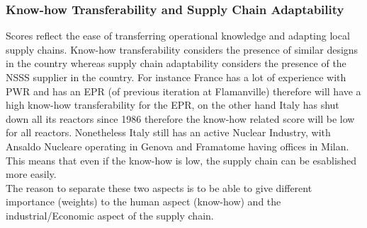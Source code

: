 



\subsubsection{Know-how Transferability and Supply Chain Adaptability}
Scores reflect the ease of transferring operational knowledge and adapting local supply chains. Know-how transferability considers the presence of similar designs in the country whereas supply chain adaptability considers the presence of the NSSS supplier in the country. For instance France has a lot of experience with PWR and has an EPR (of previous iteration at Flamanville) therefore will have a high know-how transferability for the EPR, on the other hand Italy has shut down all its reactors since 1986 therefore the know-how related score will be low for all reactors. Nonetheless Italy still has an active Nuclear Industry, with Ansaldo Nucleare operating in Genova and Framatome having offices in Milan. This means that even if the know-how is low, the supply chain can be esablished more easily. \\

The reason to separate these two aspects is to be able to give different importance (weights) to the human aspect (know-how) and the industrial/Economic aspect of the supply chain. \\

